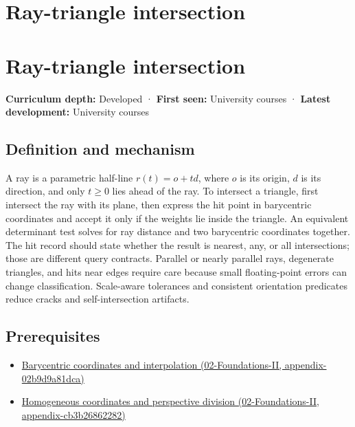 \hypertarget{appendix-47ac1bd6d144}{}
\section*{Ray-triangle intersection}
\section{Ray-triangle intersection}\label{appendix-47ac1bd6d144-ray-triangle-intersection}

\textbf{Curriculum depth:} Developed · \textbf{First seen:} University courses · \textbf{Latest development:} University courses

\subsection{Definition and mechanism}\label{appendix-47ac1bd6d144-definition-and-mechanism}

A ray is a parametric half-line \(r(t)=o+td\), where \(o\) is its origin, \(d\) is its direction, and only \(t\ge0\) lies ahead of the ray. To intersect a triangle, first intersect the ray with its plane, then express the hit point in barycentric coordinates and accept it only if the weights lie inside the triangle. An equivalent determinant test solves for ray distance and two barycentric coordinates together. The hit record should state whether the result is nearest, any, or all intersections; those are different query contracts. Parallel or nearly parallel rays, degenerate triangles, and hits near edges require care because small floating-point errors can change classification. Scale-aware tolerances and consistent orientation predicates reduce cracks and self-intersection artifacts.

\subsection{Prerequisites}\label{appendix-47ac1bd6d144-prerequisites}

\begin{itemize}
\tightlist
\item
  \href{../02-Foundations-II/main.pdf\#nameddest=appendix-02b9d9a81dca}{Barycentric coordinates and interpolation (02-Foundations-II, appendix-02b9d9a81dca)}
\item
  \href{../02-Foundations-II/main.pdf\#nameddest=appendix-cb3b26862282}{Homogeneous coordinates and perspective division (02-Foundations-II, appendix-cb3b26862282)}
\end{itemize}

